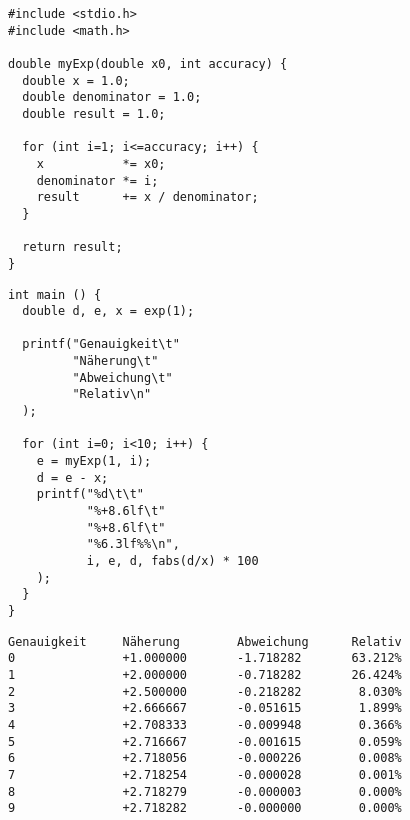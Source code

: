 
\begin{frame}[fragile]
%
%
\begin{codebox}[Beispiel ...]
\begin{verbatim}
#include <stdio.h>
#include <math.h>

double myExp(double x0, int accuracy) {
  double x = 1.0;
  double denominator = 1.0;
  double result = 1.0;

  for (int i=1; i<=accuracy; i++) {
    x           *= x0;
    denominator *= i;
    result      += x / denominator;
  }
  
  return result;
}
\end{verbatim}
\end{codebox}
%
\begin{codebox}[... Fortsetzung]
\begin{verbatim}
int main () {
  double d, e, x = exp(1);

  printf("Genauigkeit\t"
         "Näherung\t"
         "Abweichung\t"
         "Relativ\n"
  );

  for (int i=0; i<10; i++) {
    e = myExp(1, i);
    d = e - x;
    printf("%d\t\t"
           "%+8.6lf\t"
           "%+8.6lf\t"
           "%6.3lf%%\n",
           i, e, d, fabs(d/x) * 100
    );
  }
}
\end{verbatim}
\end{codebox}
%
\end{frame}


\begin{frame}[fragile]
%
\begin{cmdbox}
\begin{verbatim}
Genauigkeit     Näherung        Abweichung      Relativ
0               +1.000000       -1.718282       63.212%
1               +2.000000       -0.718282       26.424%
2               +2.500000       -0.218282        8.030%
3               +2.666667       -0.051615        1.899%
4               +2.708333       -0.009948        0.366%
5               +2.716667       -0.001615        0.059%
6               +2.718056       -0.000226        0.008%
7               +2.718254       -0.000028        0.001%
8               +2.718279       -0.000003        0.000%
9               +2.718282       -0.000000        0.000%
\end{verbatim}
\end{cmdbox}
%
\end{frame}

